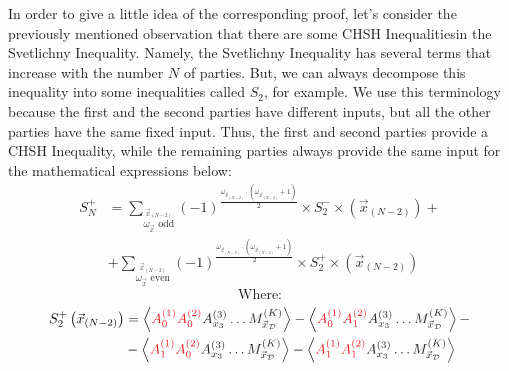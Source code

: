 \documentclass[12pt]{article}
\begin{document}
    \noindent In order to give a little idea of the corresponding proof, let's consider the previously mentioned observation that there are some CHSH Inequalities\break in the Svetlichny Inequality. Namely, the Svetlichny Inequality has several terms that increase with the number $N$ of parties. But, we can always decompose this inequality into some inequalities called ${S}_{2}$, for example. We use this terminology because the first and the second parties have different inputs, but all the other parties have the same fixed input. Thus, the first and second parties provide a CHSH Inequality, while the remaining parties always provide the same input for the mathematical expressions below:
    \begin{equation*}
        \begin{aligned}
            {S}_{N}^{+} & = \sum_{\stackrel{{\vec{x}}_{(N - 2)}}{{\omega}_{\vec{x}}\mathrm{\text{ odd}}}} {(-1)}^{\frac{ {\omega}_{{\vec{x}}_{(N - 2)}} \cdot \left( {\omega}_{{\vec{x}}_{(N - 2)}} + 1 \right) }{2}} \times {S}_{2}^{-} \times \left( {\vec{x}_{(N - 2)}} \right) + \\
            & + \sum_{\stackrel{{\vec{x}}_{(N - 2)}}{{\omega}_{\vec{x}}\mathrm{\text{ even}}}} {(-1)}^{\frac{ {\omega}_{{\vec{x}}_{(N - 2)}} \cdot \left( {\omega}_{{\vec{x}}_{(N - 2)}} + 1 \right) }{2}} \times {S}_{2}^{+} \times \left( {\vec{x}_{(N - 2)}} \right)
        \end{aligned}
    \end{equation*}
    $$ \mathrm{\text{Where:}} $$
    \begin{equation*}
        \begin{aligned}
            {S}_{2}^{+} \left( {\vec{x}_{(N - 2)}} \right) & = \left\langle \color{Red} {A}_{0}^{(1)} {A}_{0}^{(2)} \color{Black} {A}_{{x}_{3}}^{(3)} \dots {M}_{{\vec{x}}_{\mathcal{D}}}^{(K)} \right\rangle - \left\langle \color{Red} {A}_{0}^{(1)} {A}_{1}^{(2)} \color{Black} {A}_{{x}_{3}}^{(3)} \dots {M}_{{\vec{x}}_{\mathcal{D}}}^{(K)} \right\rangle - \\
            & - \left\langle \color{Red} {A}_{1}^{(1)} {A}_{0}^{(2)} \color{Black} {A}_{{x}_{3}}^{(3)} \dots {M}_{{\vec{x}}_{\mathcal{D}}}^{(K)} \right\rangle - \left\langle \color{Red} {A}_{1}^{(1)} {A}_{1}^{(2)} \color{Black} {A}_{{x}_{3}}^{(3)} \dots {M}_{{\vec{x}}_{\mathcal{D}}}^{(K)} \right\rangle
        \end{aligned}
    \end{equation*}
\end{document}
